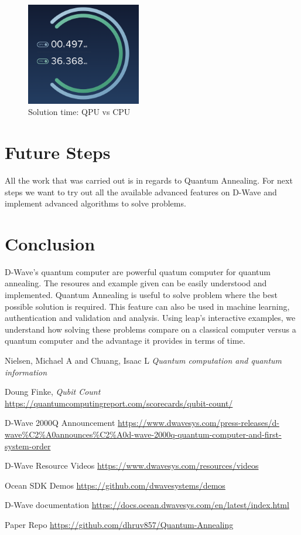 \documentclass[12pt,conference]{IEEEtran}
\begin{document}
\begin{figure}[h]
  \centering
  \includegraphics[width=5cm]{qpuvscpu.png}
  \caption{Solution time: QPU vs CPU}
  \label{fig:MCS}
\end{figure}


\section{Future Steps}
All the work that was carried out is in regards to Quantum Annealing. For next steps we want to try out all the available advanced features on D-Wave and implement advanced algorithms to solve problems. 

\section{Conclusion}
D-Wave's quantum computer are powerful quatum computer for quantum annealing. The resoures and example given can be easily understood and implemented. Quantum Annealing is useful to solve problem where the best possible solution is required. This feature can also be used in machine learning, authentication and validation and analysis. Using leap's interactive examples, we understand how solving these problems compare on a classical computer versus a quantum computer and the advantage it provides in terms of time. 

\begin{thebibliography}{r1}

Nielsen, Michael A and Chuang, Isaac L \emph{Quantum computation and quantum information}

Doung Finke, \emph{Qubit Count} \url{https://quantumcomputingreport.com/scorecards/qubit-count/}

D-Wave 2000Q Announcement \url{https://www.dwavesys.com/press-releases/d-wave%C2%A0announces%C2%A0d-wave-2000q-quantum-computer-and-first-system-order}

D-Wave Resource Videos \url{https://www.dwavesys.com/resources/videos}

Ocean SDK Demos \url{https://github.com/dwavesystems/demos}

D-Wave documentation \url{https://docs.ocean.dwavesys.com/en/latest/index.html}

Paper Repo \url{https://github.com/dhruv857/Quantum-Annealing}

\end{thebibliography}
\end{document}
